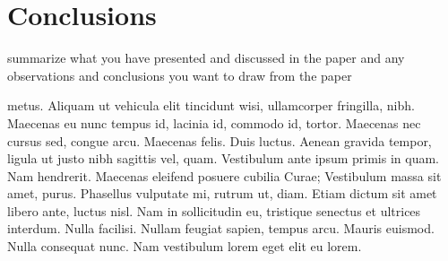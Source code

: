 \documentclass{acm_proc_article-sp}
\begin{document}
\section{Conclusions} %
\label{sec:conclusions}
summarize what you have presented and discussed in the paper and any observations and conclusions you want to draw from the paper
~\cite{ISI:000297040200003,ISI:000178732700003,springerlink:10.1023/B:DAPD.0000028552.69032.f9,486973,ISI:000080531700007,ISI:000258885400029,ISI:000228862700001,ISI:000221530300002,ISI:000181655500023,ISI:000288624000029,ISI:000287747200075,1037724,ISI:000260412900046,ISI:000229371400107,ISI:000184696600020,ISI:000237562300007,ISI:000295921100039,ISI:000180647600006,ISI:000227676400082,ISI:000178285600119,ISI:000237339900005,ISI:000225222200053,ISI:000259411102101,ISI:000075726500061,Seydim:2001:LDQ:376868.376895,ISI:000234873700048,friedman2006location,Kottkamp:1998:LQP:330560.330850,springerlink:10.1023/A:1022572210026,ISI:000277058900003,ISI:000298299000007,ISI:000228597500005,ISI:000079296600012,Dunham:1995:MCD:219713.219727,zaslavsky1998mobile,ISI:000175700600007,ISI:000288692500051,ISI:000089018200133,ISI:000167507300004,ISI:000181620000005,ISI:000180121800007,ISI:000244425700006,ISI:000241916700048,ISI:A1996BG78G00050,ISI:000271897800008,ISI:000250926900001,ISI:000173779000518,ISI:000228597500002,ISI:000171610700012,1431366,ISI:A1996UD29500003,ISI:000231416800005,ISI:000079857500007}

metus. Aliquam ut vehicula elit tincidunt wisi, ullamcorper fringilla, nibh. Maecenas eu nunc tempus id, lacinia id, commodo id, tortor. Maecenas nec cursus sed, congue arcu. Maecenas felis. Duis luctus. Aenean gravida tempor, ligula ut justo nibh sagittis vel, quam. Vestibulum ante ipsum primis in quam. Nam hendrerit. Maecenas eleifend posuere cubilia Curae; Vestibulum massa sit amet, purus. Phasellus vulputate mi, rutrum ut, diam. Etiam dictum sit amet libero ante, luctus nisl. Nam in sollicitudin eu, tristique senectus et ultrices interdum. Nulla facilisi. Nullam feugiat sapien, tempus arcu. Mauris euismod. Nulla consequat nunc. Nam vestibulum lorem eget elit eu lorem.




\balancecolumns
\end{document}
